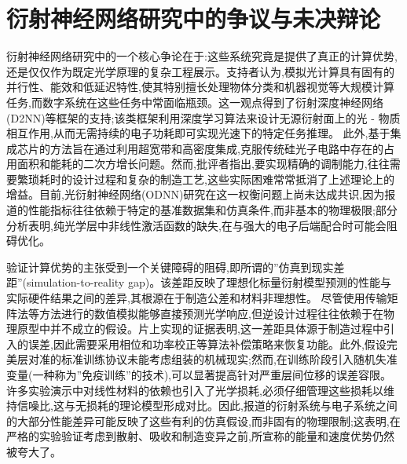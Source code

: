 \documentclass[11pt]{article}
\begin{document}
\section{衍射神经网络研究中的争议与未决辩论}\label{ux884dux5c04ux795eux7ecfux7f51ux7edcux7814ux7a76ux4e2dux7684ux4e89ux8baeux4e0eux672aux51b3ux8fa9ux8bba}

衍射神经网络研究中的一个核心争论在于:这些系统究竟是提供了真正的计算优势,还是仅仅作为既定光学原理的复杂工程展示。支持者认为,模拟光计算具有固有的并行性、能效和低延迟特性,使其特别擅长处理物体分类和机器视觉等大规模计算任务,而数字系统在这些任务中常面临瓶颈。这一观点得到了衍射深度神经网络(D2NN)等框架的支持;该类框架利用深度学习算法来设计无源衍射面上的光 - 物质相互作用,从而无需持续的电子功耗即可实现光速下的特定任务推理。\citep{doi_10_1021_acsphotonics_4c01284_s001_10346917} 此外,基于集成芯片的方法旨在通过利用超宽带和高密度集成,克服传统硅光子电路中存在的占用面积和能耗的二次方增长问题。然而,批评者指出,要实现精确的调制能力,往往需要繁琐耗时的设计过程和复杂的制造工艺,这些实际困难常常抵消了上述理论上的增益。目前,光衍射神经网络(ODNN)研究在这一权衡问题上尚未达成共识,因为报道的性能指标往往依赖于特定的基准数据集和仿真条件,而非基本的物理极限;部分分析表明,纯光学层中非线性激活函数的缺失,在与强大的电子后端配合时可能会阻碍优化。\citep{doi_10_3390_nano14221812_4d7d91b1} \citep{doi_10_1515_nanoph_2022_0358_04e3cc8d} \citep{doi_10_1038_s41467_022_28702_0_1b79b43c} \citep{doi_10_1109_jstqe_2019_2921376_c2bef7d6}

验证计算优势的主张受到一个关键障碍的阻碍,即所谓的''仿真到现实差距''(simulation-to-reality gap)。该差距反映了理想化标量衍射模型预测的性能与实际硬件结果之间的差异,其根源在于制造公差和材料非理想性。\citep{doi_10_1117_12_3013482_d44587c1} \citep{doi_10_1117_12_3084472_3a4f4f5d} 尽管使用传输矩阵法等方法进行的数值模拟能够直接预测光学响应,但逆设计过程往往依赖于在物理原型中并不成立的假设。片上实现的证据表明,这一差距具体源于制造过程中引入的误差,因此需要采用相位和功率校正等算法补偿策略来恢复功能。此外,假设完美层对准的标准训练协议未能考虑组装的机械现实;然而,在训练阶段引入随机失准变量(一种称为''免疫训练''的技术),可以显著提高针对严重层间位移的误差容限。\citep{doi_10_1515_nanoph_2020_0291_c4a9f42d} 许多实验演示中对线性材料的依赖也引入了光学损耗,必须仔细管理这些损耗以维持信噪比,这与无损耗的理论模型形成对比。因此,报道的衍射系统与电子系统之间的大部分性能差异可能反映了这些有利的仿真假设,而非固有的物理限制;这表明,在严格的实验验证考虑到散射、吸收和制造变异之前,所宣称的能量和速度优势仍然被夸大了。\citep{doi_10_1016_j_isci_2025_112222_1f7c10f5} \citep{doi_10_1038_s41598_025_19638_8_1b2db1c9} \citep{doi_10_1515_nanoph_2020_0291_c4a9f42d} \citep{doi_10_1126_science_aat8084_e055772d} \citep{s2_94f3822c453a2ab6d44c59f1f60026acb15739af_1ae3e4a4}
\end{document}
